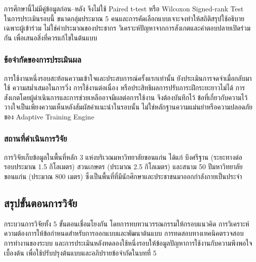 การศึกษานี้ไม่มีคู่ข้อมูลก่อน--หลัง จึงไม่ใช้ Paired t-test หรือ Wilcoxon Signed-rank Test ในการประเมินรอบนี้ ขนาดกลุ่มประมาณ 5 คนและการคัดเลือกแบบเจาะจงทำให้สถิติสรุปใช้อธิบายเฉพาะผู้เข้าร่วม ไม่ใช่ค่าประมาณของประชากร \cite{budiu2021five} วิเคราะห์ปัญหาจากการสังเกตและคำตอบปลายเปิดร่วมกัน เพื่อเสนอสิ่งที่ควรแก้ไขในต้นแบบ

\subsubsection{ข้อจำกัดของการประเมินผล}

การใช้งานหนึ่งรอบสะท้อนความเข้าใจและประสบการณ์ครั้งแรกเท่านั้น ยังประเมินการจดจำเมื่อกลับมาใช้ ความสม่ำเสมอในการวิ่ง การใช้งานต่อเนื่อง หรือประสิทธิผลการปรับภาระฝึกระยะยาวไม่ได้ การสังเกตโดยผู้ดำเนินการและการช่วยเหลืออาจมีผลต่อการใช้งาน จึงต้องบันทึกไว้ ข้อที่เกี่ยวกับความไว้วางใจเป็นเพียงความเห็นหลังสัมผัสคำแนะนำในรอบนั้น ไม่ใช่หลักฐานความแม่นยำหรือความปลอดภัยของ Adaptive Training Engine

\subsubsection{สถานที่ดำเนินการวิจัย}
\label{sec:research-sites}

การวิจัยเก็บข้อมูลในพื้นที่หลัก 3 แห่งบริเวณมหาวิทยาลัยขอนแก่น ได้แก่ บึงศรีฐาน (ระยะทางต่อรอบประมาณ 1.5 กิโลเมตร) สวนเกษตร (ประมาณ 2.5 กิโลเมตร) และสนาม 50 ปีมหาวิทยาลัยขอนแก่น (ประมาณ 800 เมตร) ซึ่งเป็นพื้นที่ที่มีนักศึกษาและประชาชนมาออกกำลังกายเป็นประจำ

\subsection{สรุปขั้นตอนการวิจัย}

กระบวนการวิจัยทั้ง 5 ขั้นตอนเชื่อมโยงกัน โดยการทบทวนวรรณกรรมให้กรอบแนวคิด การวิเคราะห์ความต้องการให้ข้อกำหนดสำหรับการออกแบบและพัฒนาต้นแบบ การทดสอบทางเทคนิคตรวจสอบการทำงานของระบบ และการประเมินหลังทดลองใช้หนึ่งรอบให้ข้อมูลปัญหาการใช้งานกับความพึงพอใจเบื้องต้น เพื่อใช้ปรับปรุงต้นแบบและอภิปรายข้อจำกัดในบทที่ 5

